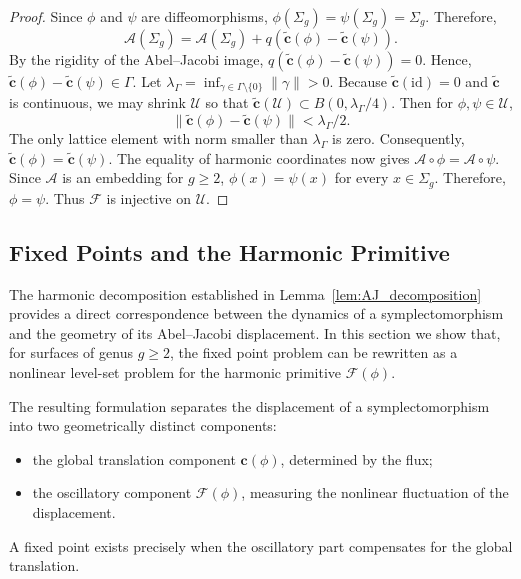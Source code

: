\documentclass[11pt]{article}
\theoremstyle{definition}
\begin{document}
\begin{proof}
		Since $\phi$ and $\psi$ are diffeomorphisms, $\phi(\Sigma_g)=\psi(\Sigma_g)=\Sigma_g.$
		Therefore,
		\[
		\mathcal A(\Sigma_g) = \mathcal A(\Sigma_g) + q(\widetilde{\mathbf c}(\phi) -
		\widetilde{\mathbf c}(\psi)).
		\]
		By the rigidity of the Abel--Jacobi image, $q(\widetilde{\mathbf c}(\phi) -
		\widetilde{\mathbf c}(\psi)) =0.$ Hence, $\widetilde{\mathbf c}(\phi) -
		\widetilde{\mathbf c}(\psi)\in\Gamma.$ Let $\lambda_\Gamma =
		\inf_{\gamma\in\Gamma\setminus\{0\}} \|\gamma\|>0.$ Because $\widetilde{\mathbf
			c}(\mathrm{id})=0$ and $\widetilde{\mathbf c}$ is continuous, we may shrink
		$\mathcal U$ so that $\widetilde{\mathbf c}(\mathcal U) \subset
		B(0,\lambda_\Gamma/4).$ Then for $\phi,\psi\in\mathcal U$,
		\[
		\|\widetilde{\mathbf c}(\phi) - \widetilde{\mathbf c}(\psi)\| <
		\lambda_\Gamma/2.
		\]
		The only lattice element with norm smaller than $\lambda_\Gamma$ is zero.
		Consequently, $\widetilde{\mathbf c}(\phi) = \widetilde{\mathbf c}(\psi).$ The
		equality of harmonic coordinates now gives $\mathcal A\circ\phi = \mathcal
		A\circ\psi.$ Since $\mathcal A$ is an embedding for $g\ge2$,
		$\phi(x)=\psi(x)$ for every $x\in\Sigma_g$. Therefore, $\phi=\psi.$ Thus
		$\mathcal F$ is injective on $\mathcal U$.
	\end{proof}
	
	\subsection{Fixed Points and the Harmonic Primitive}\label{subsec:fixed_points}
	
	The harmonic decomposition established in Lemma~\ref{lem:AJ_decomposition}
	provides a direct correspondence between the dynamics of a symplectomorphism and
	the geometry of its Abel--Jacobi displacement. In this section we show that, for
	surfaces of genus $g\geq 2$, the fixed point problem can be rewritten as a
	nonlinear level-set problem for the harmonic primitive $\mathcal F(\phi)$.
	
	The resulting formulation separates the displacement of a symplectomorphism into
	two geometrically distinct components:
	\begin{itemize}
		\item the global translation component $\mathbf c(\phi)$, determined by the flux;
		\item the oscillatory component $\mathcal F(\phi)$, measuring the nonlinear
		fluctuation of the displacement.
	\end{itemize}
	A fixed point exists precisely when the oscillatory part compensates for the
	global translation.
	
\end{document}
